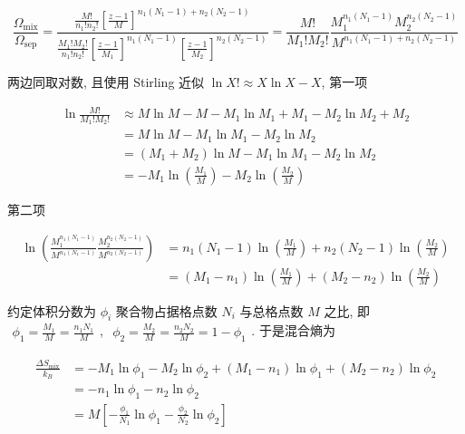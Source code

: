 \documentclass[../../main.tex]{subfiles}
\begin{document}
\begin{enumerate}
{{$$
\frac{\Omega_{\text{mix}}}{\Omega_{\text{sep}}} = \frac{\frac{M!}{n_{1}!n_{2}!}\left[\frac{z-1}{M}\right]^{n_{1}(N_{1}-1) + n_{2}(N_{2}-1)}}{\frac{M_{1}!M_{2}!}{n_{1}!n_{2}!} \left[\frac{z-1}{M_{1}}\right]^{n_{1}(N_{1}-1)} \left[\frac{z-1}{M_{2}}\right]^{n_{2}(N_{2}-1)}} = \frac{M!}{M_{1}!M_{2}!}\frac{M_{1}^{n_{1}(N_{1}-1)}M_{2}^{n_{2}(N_{2}-1)}}{M^{n_{1}(N_{1}-1) + n_{2}(N_{2}-1)}}
$$

两边同取对数, 且使用 Stirling 近似 $\ln{X!}\approx X\ln{X} - X$, 第一项

$$
\begin{aligned}
\ln{\frac{M!}{M_{1}!M_{2}!}} &\approx M\ln{M} - M - M_{1}\ln{M_{1}} + M_{1} - M_{2}\ln{M_{2}} + M_{2} \\
&= M\ln{M} - M_{1}\ln{M_{1}} - M_{2}\ln{M_{2}}\\
&= (M_{1}+M_{2})\ln{M} - M_{1}\ln{M_{1}} - M_{2}\ln{M_{2}}\\
&= -M_{1}\ln{\left(\frac{M_{1}}{M}\right)} - M_{2}\ln{\left(\frac{M_{2}}{M}\right)}
\end{aligned}
$$

第二项

$$
\begin{aligned}
\ln{\left(\frac{M_{1}^{n_{1}(N_{1}-1)}}{M^{n_{1}(N_{1}-1)}}\frac{M_{2}^{n_{2}(N_{2}-1)}}{M^{n_{2}(N_{2}-1)}}\right)} &= n_{1}(N_{1}-1)\ln{\left(\frac{M_{1}}{M}\right)} + n_{2}(N_{2}-1)\ln{\left(\frac{M_{2}}{M}\right)}\\
&= (M_{1}-n_{1}) \ln{\left(\frac{M_{1}}{M}\right)} + (M_{2}-n_{2})\ln{\left(\frac{M_{2}}{M}\right)}
\end{aligned}
$$

约定体积分数为 $\phi_{i}$ 聚合物占据格点数 $N_{i}$ 与总格点数 $M$ 之比, 即 $\begin{aligned}\phi_{1} = \frac{M_{1}}{M} = \frac{n_{1}N_{1}}{M}\end{aligned}$, $\begin{aligned}\phi_{2} = \frac{M_{2}}{M} = \frac{n_{2}N_{2}}{M} = 1- \phi_{1}\end{aligned}$. 于是混合熵为

$$
\begin{aligned}
\frac{\Delta S_{\text{mix}}}{k_{B}} &= -M_{1}\ln{\phi_{1}} - M_{2}\ln{\phi_{2}} + (M_{1}-n_{1}) \ln{\phi_{1}} + (M_{2}-n_{2})\ln{\phi_{2}}\\
&= - n_{1}\ln{\phi_{1}} - n_{2}\ln{\phi_{2}}\\
&= M\left[ - \frac{\phi_{1}}{N_{1}}\ln{\phi_{1}} - \frac{\phi_{2}}{N_{2}}\ln{\phi_{2}} \right]
\end{aligned}
$$

}}
\end{enumerate}
\end{document}
